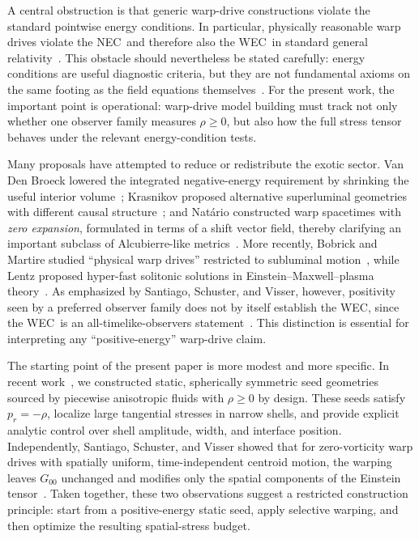 \documentclass[11pt]{article}
\makeatletter
\newcommand{\@abbr}[1]{\ifmmode\mathrm{#1}\else\textsc{#1}\fi}
\newcommand{\WEC}{\@abbr{WEC}}
\newcommand{\NEC}{\@abbr{NEC}}
\makeatother
\begin{document}
A central obstruction is that generic warp-drive constructions violate the standard pointwise energy conditions. In particular, physically reasonable warp drives violate the \NEC\ and therefore also the \WEC\ in standard general relativity~\cite{Olum:1998mu,Santiago:2021aup}.  This obstacle should nevertheless be stated carefully: energy conditions are useful diagnostic criteria, but they are not fundamental axioms on the same footing as the field equations themselves~\cite{Curiel:2014zba,Kontou:2020bta}. For the present work, the important point is operational: warp-drive model building must track not only whether one observer family measures $\rho\ge 0$, but also how the full stress tensor behaves under the relevant energy-condition tests.

Many proposals have attempted to reduce or redistribute the exotic sector. Van Den Broeck lowered the integrated negative-energy requirement by shrinking the useful interior volume~\cite{VanDenBroeck:1999}; Krasnikov proposed alternative superluminal geometries with different causal structure~\cite{Krasnikov:1998}; and Nat\'ario constructed warp spacetimes with \emph{zero expansion}, formulated in terms of a shift vector field, thereby clarifying an important subclass of Alcubierre-like metrics~\cite{Natario:2001}. More recently, Bobrick and Martire studied ``physical warp drives'' restricted to subluminal motion~\cite{Bobrick:2021}, while Lentz proposed hyper-fast solitonic solutions in Einstein--Maxwell--plasma theory~\cite{Lentz:2020euv}. As emphasized by Santiago, Schuster, and Visser, however, positivity seen by a preferred observer family does not by itself establish the \WEC, since the \WEC\ is an all-timelike-observers statement~\cite{Santiago:2021aup}. This distinction is essential for interpreting any ``positive-energy'' warp-drive claim.

The starting point of the present paper is more modest and more specific. In recent work~\cite{Bolivar:2025a}, we constructed static, spherically symmetric seed geometries sourced by piecewise anisotropic fluids with $\rho\ge 0$ by design. These seeds satisfy $p_r=-\rho$, localize large tangential stresses in narrow shells, and provide explicit analytic control over shell amplitude, width, and interface position. Independently, Santiago, Schuster, and Visser showed that for zero-vorticity warp drives with spatially uniform, time-independent centroid motion, the warping leaves $G_{00}$ unchanged and modifies only the spatial components of the Einstein tensor~\cite{Santiago:2021aup,Schuster:2023ADMmass}. Taken together, these two observations suggest a restricted construction principle: start from a positive-energy static seed, apply selective warping, and then optimize the resulting spatial-stress budget.
\end{document}
